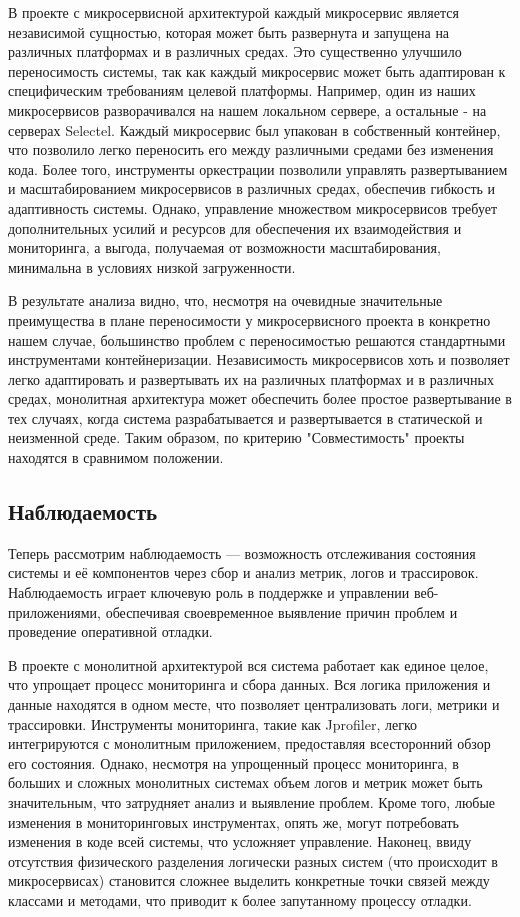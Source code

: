     В проекте с микросервисной архитектурой каждый микросервис является независимой сущностью, которая может быть развернута и запущена на различных платформах и в различных средах. Это существенно улучшило переносимость системы, так как каждый микросервис может быть адаптирован к специфическим требованиям целевой платформы. Например, один из наших микросервисов разворачивался на нашем локальном сервере, а остальные - на серверах Selectel. Каждый микросервис был упакован в собственный контейнер, что позволило легко переносить его между различными средами без изменения кода. Более того, инструменты оркестрации позволили управлять развертыванием и масштабированием микросервисов в различных средах, обеспечив гибкость и адаптивность системы. Однако, управление множеством микросервисов требует дополнительных усилий и ресурсов для обеспечения их взаимодействия и мониторинга, а выгода, получаемая от возможности масштабирования, минимальна в условиях низкой загруженности.
    
    В результате анализа видно, что, несмотря на очевидные значительные преимущества в плане переносимости у микросервисного проекта в конкретно нашем случае, большинство проблем с переносимостью решаются стандартными инструментами контейнеризации. Независимость микросервисов хоть и позволяет легко адаптировать и развертывать их на различных платформах и в различных средах, монолитная архитектура может обеспечить более простое развертывание в тех случаях, когда система разрабатывается и развертывается в статической и неизменной среде.  Таким образом, по критерию "Совместимость" проекты находятся в сравнимом положении.

\subsection{Наблюдаемость}
    Теперь рассмотрим наблюдаемость — возможность отслеживания состояния системы и её компонентов через сбор и анализ метрик, логов и трассировок. Наблюдаемость играет ключевую роль в поддержке и управлении веб-приложениями, обеспечивая своевременное выявление причин проблем и проведение оперативной отладки.
    
    В проекте с монолитной архитектурой вся система работает как единое целое, что упрощает процесс мониторинга и сбора данных. Вся логика приложения и данные находятся в одном месте, что позволяет централизовать логи, метрики и трассировки. Инструменты мониторинга, такие как Jprofiler, легко интегрируются с монолитным приложением, предоставляя всесторонний обзор его состояния. Однако, несмотря на упрощенный процесс мониторинга, в больших и сложных монолитных системах объем логов и метрик может быть значительным, что затрудняет анализ и выявление проблем. Кроме того, любые изменения в мониторинговых инструментах, опять же, могут потребовать изменения в коде всей системы, что усложняет управление. Наконец, ввиду отсутствия физического разделения логически разных систем (что происходит в микросервисах) становится сложнее выделить конкретные точки связей между классами и методами, что приводит к более запутанному процессу отладки.
    
